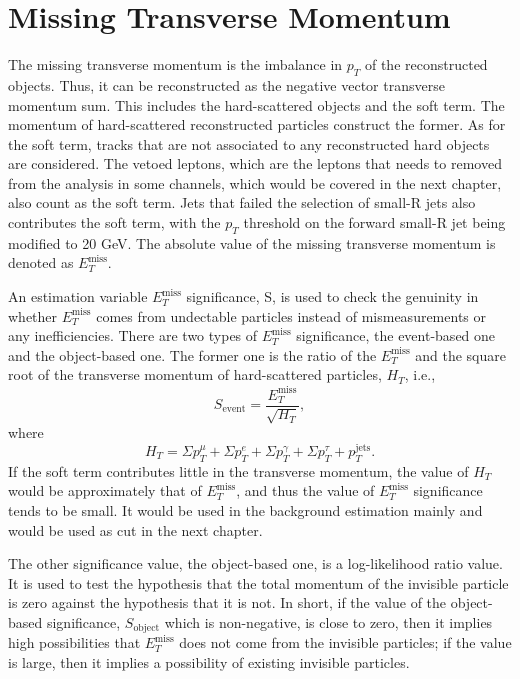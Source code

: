 \documentclass[class=NCU_thesis, crop=false]{standalone}
\begin{document}
\section{Missing Transverse Momentum}\label{MET}
	The missing transverse momentum is the imbalance in $p_T$ of the reconstructed objects. Thus, it can be reconstructed as the negative vector transverse momentum sum. This includes the hard-scattered objects and the soft term. The momentum of hard-scattered reconstructed particles construct the former. As for the soft term, tracks that are not associated to any reconstructed hard objects are considered. The vetoed leptons, which are the leptons that needs to removed from the analysis in some channels, which would be covered in the next chapter, also count as the soft term. Jets that failed the selection of small-R jets also contributes the soft term, with the $p_T$ threshold on the forward small-R jet being modified to 20 GeV. The absolute value of the missing transverse momentum is denoted as $E_T^{\mathrm{miss}}$.
	
	An estimation variable $E_T^{\mathrm{miss}}$ significance, S, is used to check the genuinity in whether $E_T^{\mathrm{miss}}$ comes from undectable particles instead of mismeasurements or any inefficiencies. There are two types of $E_T^{\mathrm{miss}}$ significance, the event-based one and the object-based one. The former one is the ratio of the $E_T^{\mathrm{miss}}$ and the square root of the transverse momentum of hard-scattered particles, $H_T$, i.e.,
	\begin{equation}
		S_{\mathrm{event}} = \frac{E_T^{\mathrm{miss}}}{\sqrt{H_T}},
	\end{equation}
	where
	\begin{equation}
		H_T = \Sigma p_T^{\mu} + \Sigma p_T^e + \Sigma p_T^{\gamma} + \Sigma p_T^{\tau} + p_T^{\mathrm{jets}}.
	\end{equation}
	If the soft term contributes little in the transverse momentum, the value of $H_T$ would be approximately that of $E_T^{\mathrm{miss}}$, and thus the value of $E_T^{\mathrm{miss}}$ significance tends to be small. It would be used in the background estimation mainly and would be used as cut in the next chapter.
	
	The other significance value, the object-based one, is a log-likelihood ratio value. It is used to test the hypothesis that the total momentum of the invisible particle is zero against the hypothesis that it is not. In short, if the value of the object-based significance, $S_{\mathrm{object}}$ which is non-negative, is close to zero, then it implies high possibilities that $E_T^{\mathrm{miss}}$ does not come from the invisible particles; if the value is large, then it implies a possibility of existing invisible particles.
	
\end{document}
